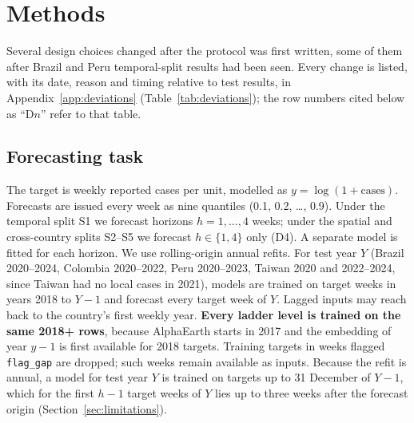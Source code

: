 \documentclass[11pt]{article}
\begin{document}
\section{Methods}
\label{sec:methods}

Several design choices changed after the protocol was first written, some of them after Brazil and
Peru temporal-split results had been seen. Every change is listed, with its date, reason and timing
relative to test results, in Appendix~\ref{app:deviations} (Table~\ref{tab:deviations}); the
row numbers cited below as ``D$n$'' refer to that table.

\subsection{Forecasting task}
The target is weekly reported cases per unit, modelled as $y=\log(1+\text{cases})$. Forecasts are
issued every week as nine quantiles (0.1, 0.2, \dots, 0.9). Under the temporal split S1 we forecast
horizons $h=1,\dots,4$ weeks; under the spatial and cross-country splits S2--S5 we forecast
$h\in\{1,4\}$ only (D4). A separate model is fitted for each horizon. We use rolling-origin annual
refits. For test year $Y$ (Brazil 2020--2024, Colombia 2020--2022, Peru 2020--2023, Taiwan 2020 and
2022--2024, since Taiwan had no local cases in 2021), models are trained on target weeks in years 2018
to $Y-1$ and forecast every target week of $Y$. Lagged inputs may reach back to the country's first
weekly year. \textbf{Every ladder level is trained on the same 2018+ rows}, because AlphaEarth starts
in 2017 and the embedding of year $y-1$ is first available for 2018 targets. Training targets in
weeks flagged \texttt{flag\_gap} are dropped; such weeks remain available as inputs. Because the refit
is annual, a model for test year $Y$ is trained on targets up to 31 December of $Y-1$, which for the
first $h-1$ target weeks of $Y$ lies up to three weeks after the forecast origin
(Section~\ref{sec:limitations}).
\end{document}
